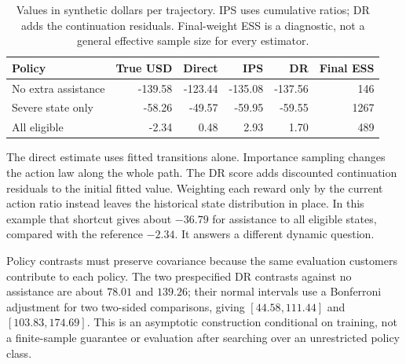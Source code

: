 \begin{table}[htbp]\centering\small


\begin{tabular}{@{}lrrrrr@{}}
\toprule
Policy & True USD & Direct & IPS & DR & Final ESS\\
\midrule
No extra assistance & -139.58 & -123.44 & -135.08 & -137.56 & 146\\
Severe state only & -58.26 & -49.57 & -59.95 & -59.55 & 1267\\
All eligible & -2.34 & 0.48 & 2.93 & 1.70 & 489\\
\bottomrule
\end{tabular}



\caption{Values in synthetic dollars per trajectory. IPS uses cumulative
ratios; DR adds the continuation residuals. Final-weight ESS is a
diagnostic, not a general effective sample size for every estimator.}
\end{table}

The direct estimate uses fitted transitions alone. Importance sampling
changes the action law along the whole path. The DR score adds discounted
continuation residuals to the initial fitted value. Weighting each
reward only by the current action ratio instead leaves the historical
state distribution in place. In this example that shortcut gives about
$-36.79$ for assistance to all eligible states, compared with the
reference $-2.34$. It answers a different dynamic question.

Policy contrasts must preserve covariance because the same evaluation
customers contribute to each policy. The two prespecified DR contrasts
against no assistance are about $78.01$ and $139.26$; their normal
intervals use a Bonferroni adjustment for two two-sided comparisons,
giving $[44.58,111.44]$ and $[103.83,174.69]$. This is an asymptotic
construction conditional on training, not a finite-sample guarantee or
evaluation after searching over an unrestricted policy class.

